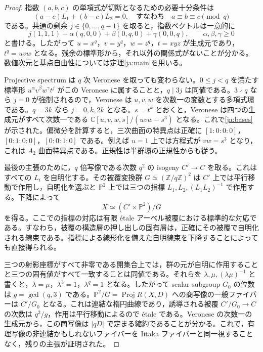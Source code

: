 \documentclass[12pt]{amsart}
\theoremstyle{definition}
\theoremstyle{remark}
\numberwithin{equation}{section}
\newcommand{\Z}{\mathbb{Z}}
\newcommand{\C}{\mathbb{C}}
\newcommand{\mP}{\mathbb{P}}
\DeclareMathOperator{\Proj}{Proj}
\begin{document}
\begin{proof}
指数 $(a,b,c)$ の単項式が切断となるための必要十分条件は
\[
 (a-c)L_1+(b-c)L_2=0,
 \quad\text{すなわち}\quad a\equiv b\equiv c\pmod q
\]
である。共通の剰余 $j\in\{0,\ldots,q-1\}$ を取ると，指数ベクトルは一意的に
\[
 j(1,1,1)+\alpha(q,0,0)+\beta(0,q,0)+\gamma(0,0,q),
 \qquad\alpha,\beta,\gamma\geq0
\]
と書ける。したがって $u=x^q$，$v=y^q$，$w=z^q$，$t=xyz$ が生成元であり，$t^q=uvw$ となる。残余の標準形から，それ以外の関係式がないことが分かる。数値次元と基点自由性については定理\ref{ja:main}を用いる。

Projective spectrum は $q$ 次 Veronese を取っても変わらない。$0\leq j<q$ を満たす標準形 $u^\alpha v^\beta w^\gamma t^j$ がこの Veronese に属することと，$q\mid3j$ は同値である。$3\nmid q$ なら $j=0$ が強制されるので，Veronese は $u,v,w$ を次数一の変数とする多項式環である。$q=3k$ なら $j=0,k,2k$ となる。$s=t^k$ とおくと，Veronese は四つの生成元がすべて次数一である $\C[u,v,w,s]/(uvw-s^3)$ となる。これで\eqref{ja:bases}が示された。偏微分を計算すると，三次曲面の特異点は正確に $[1:0:0:0]$，$[0:1:0:0]$，$[0:0:1:0]$ である。例えば $u=1$ 上では方程式が $vw=s^3$ となり，これは $A_2$ 曲面特異点である。正規性は半群環の正規性からも従う。

最後の主張のために，$q$ 倍写像である次数 $q^2$ の isogeny $C'\to C$ を取る。これはすべての $L_i$ を自明化する。その被覆変換群 $G\simeq(\Z/q\Z)^2$ は $C'$ 上では平行移動で作用し，自明化を選ぶと $\mP^2$ 上では三つの指標 $L_1,L_2,(L_1L_2)^{-1}$ で作用する。下降によって
\[
 X\simeq(C'\times\mP^2)/G
\]
を得る。ここでの指標の対応は有限 \'etale アーベル被覆における標準的な対応である。すなわち，被覆の構造層の押し出しの固有層は，正確にその被覆で自明化される線束である。指標による線形化を備えた自明線束を下降することによっても直接得られる。

三つの射影座標がすべて非零である開集合上では，群の元が自明に作用することと三つの固有値がすべて一致することは同値である。それらを $\lambda,\mu,(\lambda\mu)^{-1}$ と書くと，$\lambda=\mu$，$\lambda^3=1$，$\lambda^q=1$ となる。したがって scalar subgroup $G_0$ の位数は $g=\gcd(q,3)$ である。$\mP^2/G=\Proj R(X,D)$ への商写像の一般ファイバーは $C'/G_0$ となる。これは連結な楕円曲線であり，誘導される被覆 $C'/G_0\to C$ の次数は $q^2/g$，作用は平行移動によるので \'etale である。Veronese の次数一の生成元から，この商写像は $|qD|$ で定まる縮約であることが分かる。これで，有理写像の非連結かもしれないファイバーを Iitaka ファイバーと同一視することなく，残りの主張が証明された。
\end{proof}
\end{document}
